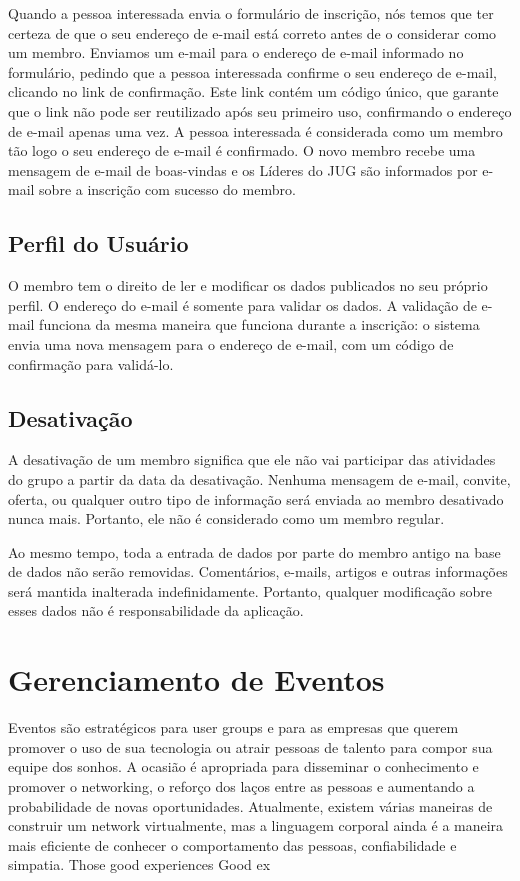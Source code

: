 \documentclass[envcountsame,envcountchap,letterpaper]{svmono}
\begin{document}
Quando a pessoa interessada envia o formulário de inscrição, nós temos que ter certeza de que o seu endereço de e-mail está correto antes de o considerar como um membro. Enviamos um e-mail para o endereço de e-mail informado no formulário, pedindo que a pessoa interessada confirme o seu endereço de e-mail, clicando no link de confirmação. Este link contém um código único, que garante que o link não pode ser reutilizado após seu primeiro uso, confirmando o endereço de e-mail apenas uma vez. A pessoa interessada é considerada como um membro tão logo o seu endereço de e-mail é confirmado. O novo membro recebe uma mensagem de e-mail de boas-vindas e os Líderes do JUG são informados por e-mail sobre a inscrição com sucesso do membro.

\section{Perfil do Usuário}

O membro tem o direito de ler e modificar os dados publicados no seu próprio perfil. O endereço do e-mail é somente para validar os dados. A validação de e-mail funciona da mesma maneira que funciona durante a inscrição: o sistema envia uma nova mensagem para o endereço de e-mail, com um código de confirmação para validá-lo.

\section{Desativação}

A desativação de um membro significa que ele não vai participar das atividades do grupo a partir da data da desativação. Nenhuma mensagem de e-mail, convite, oferta, ou qualquer outro tipo de informação será enviada ao membro desativado nunca mais. Portanto, ele não é considerado como um membro regular.

Ao mesmo tempo, toda a entrada de dados por parte do membro antigo na base de dados não serão removidas. Comentários, e-mails, artigos e outras informações será mantida inalterada indefinidamente. Portanto, qualquer modificação sobre esses dados não é responsabilidade da aplicação.

\chapter{Gerenciamento de Eventos}
\label{chp:event-management}

Eventos são estratégicos para user groups e para as empresas que querem promover o uso de sua tecnologia ou atrair pessoas de talento para compor sua equipe dos sonhos. A ocasião é apropriada para disseminar o conhecimento e promover o networking, o reforço dos laços entre as pessoas e aumentando a probabilidade de novas oportunidades. Atualmente, existem várias maneiras de construir um network virtualmente, mas a linguagem corporal ainda é a maneira mais eficiente de conhecer o comportamento das pessoas, confiabilidade e simpatia. Those good experiences Good ex
\end{document}
